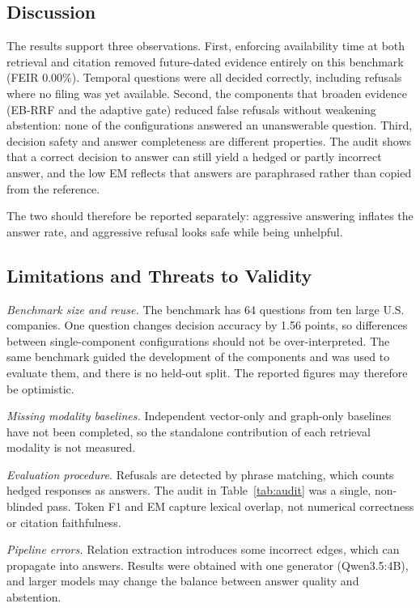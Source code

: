 \documentclass[conference]{IEEEtran}
\begin{document}
\subsection{Discussion}
The results support three observations. First, enforcing availability time at both retrieval and citation removed future-dated evidence entirely on this benchmark (FEIR 0.00\%). Temporal questions were all decided correctly, including refusals where no filing was yet available. Second, the components that broaden evidence (EB-RRF and the adaptive gate) reduced false refusals without weakening abstention: none of the configurations answered an unanswerable question. Third, decision safety and answer completeness are different properties. The audit shows that a correct decision to answer can still yield a hedged or partly incorrect answer, and the low EM reflects that answers are paraphrased rather than copied from the reference.

The two should therefore be reported separately: aggressive answering inflates the answer rate, and aggressive refusal looks safe while being unhelpful.

\subsection{Limitations and Threats to Validity}
\textit{Benchmark size and reuse.} The benchmark has 64 questions from ten large U.S. companies. One question changes decision accuracy by 1.56 points, so differences between single-component configurations should not be over-interpreted. The same benchmark guided the development of the components and was used to evaluate them, and there is no held-out split. The reported figures may therefore be optimistic.

\textit{Missing modality baselines.} Independent vector-only and graph-only baselines have not been completed, so the standalone contribution of each retrieval modality is not measured.

\textit{Evaluation procedure.} Refusals are detected by phrase matching, which counts hedged responses as answers. The audit in Table~\ref{tab:audit} was a single, non-blinded pass. Token F1 and EM capture lexical overlap, not numerical correctness or citation faithfulness.

\textit{Pipeline errors.} Relation extraction introduces some incorrect edges, which can propagate into answers. Results were obtained with one generator (Qwen3.5:4B), and larger models may change the balance between answer quality and abstention.
\end{document}
